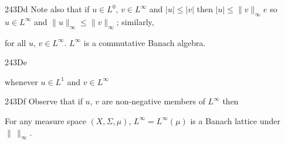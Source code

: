 \spheader 243Dd Note also that if $u\in L^0$, $v\in L^{\infty}$
and $|u|\le|v|$ then $|u|\le\|v\|_{\infty}e$ so $u\in L^{\infty}$ and
$\|u\|_{\infty}\le\|v\|_{\infty}$;  similarly,
     
     
\noindent for all $u$, $v\in L^{\infty}$.    $L^{\infty}$
is a commutative Banach algebra.
     
\spheader 243De 

     
\noindent whenever $u\in L^1$ and $v\in L^{\infty}$
     
\spheader 243Df
Observe that if $u$, $v$ are non-negative members of $L^{\infty}$ then
     
     
     
 For any measure space $(X,\Sigma,\mu)$,
$L^{\infty}=L^{\infty}(\mu)$ is a Banach lattice under
$\|\,\|_{\infty}$.
     
